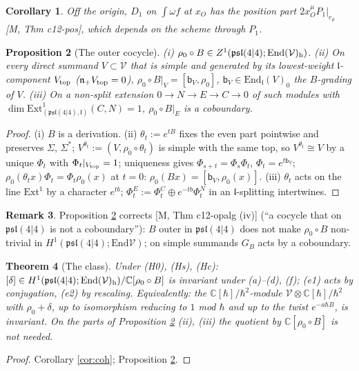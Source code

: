\documentclass[10pt]{article}
\newtheorem{theorem}{Theorem}[section]
\newtheorem{proposition}[theorem]{Proposition}
\newtheorem{corollary}[theorem]{Corollary}
\theoremstyle{definition}
\newtheorem{remark}[theorem]{Remark}
\newcommand{\pl}{\mathfrak{psl}(4|4)}
\newcommand{\V}{\mathcal V}
\newcommand{\End}{\mathrm{End}}
\newcommand{\Ext}{\mathrm{Ext}}
\newcommand{\lf}{\mathfrak l}
\begin{document}
\begin{corollary}\label{cor:Dpos}
Off the origin, $D_1$ on $\int\omega f$ at $x_O$ has the position part $2x_O^\mu P_1|_{e_\mu}$ [M, Thm c12-pos], which depends on the scheme through $P_1$.
\end{corollary}

\begin{proposition}[The outer cocycle]\label{prop:B}
(i) $\rho_0\circ B\in Z^1(\pl;\End(\V)_{\rm h})$. (ii) On every direct summand $V\subset\V$ that is simple and generated by its lowest-weight $\lf$-component $V_{\rm top}$ ($\mathfrak n_+V_{\rm top}=0$), $\rho_0\circ B|_V=[\mathsf b_V,\rho_0]$, $\mathsf b_V\in\End_{\lf}(V)_0$ the $B$-grading of $V$. (iii) On a non-split extension $0\to N\to E\to C\to0$ of such modules with $\dim\Ext^1_{(\pl,\lf)}(C,N)=1$, $\rho_0\circ B|_E$ is a coboundary.
\end{proposition}
\begin{proof}
(i) $B$ is a derivation. (ii) $\theta_t:=e^{tB}$ fixes the even part pointwise and preserves $\Sigma$, $\Sigma^*$; $V^{\theta_t}:=(V,\rho_0\circ\theta_t)$ is simple with the same top, so $V^{\theta_t}\cong V$ by a unique $\Phi_t$ with $\Phi_t|_{V_{\rm top}}=1$; uniqueness gives $\Phi_{s+t}=\Phi_s\Phi_t$, $\Phi_t=e^{t\mathsf b_V}$; $\rho_0(\theta_tx)\Phi_t=\Phi_t\rho_0(x)$ at $t=0$: $\rho_0(Bx)=[\mathsf b_V,\rho_0(x)]$. (iii) $\theta_t$ acts on the line $\Ext^1$ by a character $e^{tb}$; $\Phi^E_t:=\Phi^C_t\oplus e^{-tb}\Phi^N_t$ in an $\lf$-splitting intertwines.
\end{proof}

\begin{remark}
Proposition \ref{prop:B} corrects [M, Thm c12-opalg (iv)] (``a cocycle that on $\pl$ is not a coboundary''): $B$ outer in $\pl$ does not make $\rho_0\circ B$ non-trivial in $H^1(\pl;\End\V)$; on simple summands $G_B$ acts by a coboundary.
\end{remark}

\begin{theorem}[The class]\label{thm:class}
Under (H0), (Hs), (Hc): $[\delta]\in H^1(\pl;\End(\V)_{\rm h})/\mathbb C[\rho_0\circ B]$ is invariant under (a)--(d), (f); (e1) acts by conjugation, (e2) by rescaling. Equivalently: the $\mathbb C[\hbar]/\hbar^2$-module $\V\otimes\mathbb C[\hbar]/\hbar^2$ with $\rho_0+\delta$, up to isomorphism reducing to $1$ mod $\hbar$ and up to the twist $e^{-a\hbar B}$, is invariant. On the parts of Proposition \ref{prop:B} (ii), (iii) the quotient by $\mathbb C[\rho_0\circ B]$ is not needed.
\end{theorem}
\begin{proof}
Corollary \ref{cor:coh}; Proposition \ref{prop:B}.
\end{proof}
\end{document}
